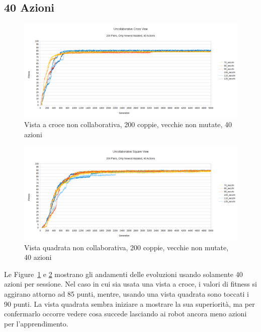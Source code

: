 \subsection{40 Azioni}
\begin{figure}[ht]
	\centering
	\includegraphics[scale=0.7,angle=90]{imgs/cross_nc_200_pairs_70_120_old_not_mutated_40_actions.png}
	\caption{Vista a croce non collaborativa, 200 coppie, vecchie non mutate, 40 azioni}
	\label{figure:cross_nc_200_70_120_non_40_actions}
\end{figure}
\begin{figure}[ht]
	\centering
	\includegraphics[scale=0.7,angle=90]{imgs/square_nc_200_pairs_70_120_old_not_mutated_40_actions.png}
	\caption{Vista quadrata non collaborativa, 200 coppie, vecchie non mutate, 40 azioni}
	\label{figure:square_nc_200_70_120_non_40_actions}
\end{figure}
Le Figure~\ref{figure:cross_nc_200_70_120_non_40_actions} e
\ref{figure:square_nc_200_70_120_non_40_actions} mostrano gli andamenti delle
evoluzioni usando solamente 40 azioni per sessione. Nel caso in cui sia usata
una vista a croce, i valori di fitness si aggirano attorno ad 85 punti, mentre,
usando una vista quadrata sono toccati i 90 punti.\newline
La vista quadrata sembra iniziare a mostrare la sua superiorità, ma per
confermarlo occorre vedere cosa succede lasciando ai robot ancora meno azioni
per l'apprendimento.

